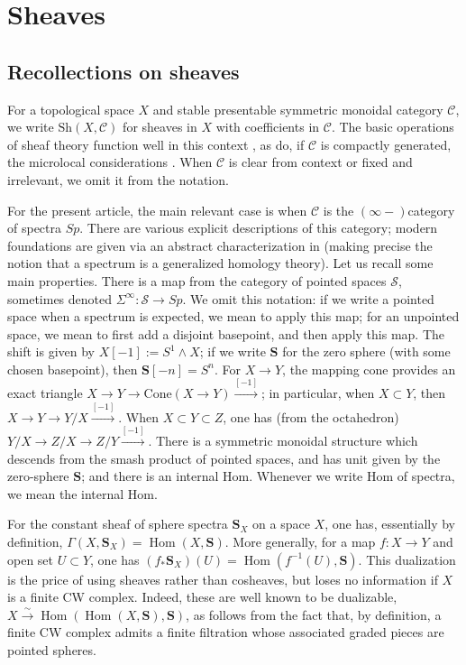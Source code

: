 \documentclass[12pt,a4paper]{article}
\numberwithin{equation}{section}
\theoremstyle{definition}
\theoremstyle{remark}
\newcommand{\Sh}{\mathrm{Sh}}
\renewcommand{\S}{\mathbf{S}}
\DeclareMathOperator{\Hom}{Hom}
\begin{document}
\section{Sheaves}\label{sec:Sh}
\subsection{Recollections on sheaves}
For a topological space $X$ and stable presentable symmetric monoidal category $\mathcal{C}$, we write $\Sh(X, \mathcal{C})$ for sheaves in $X$ with coefficients in $\mathcal{C}$.
The basic operations of sheaf theory function well in this context \cite{Volpe}, as do, if $\mathcal{C}$ is compactly generated, the microlocal considerations \cite{Robalo-Schapira}.   When $\mathcal{C}$ is clear from context or fixed and irrelevant, we omit it from the notation.

For the present article, the main relevant case is when $\mathcal{C}$ is the $(\infty-)$category of spectra $Sp$.  There are various explicit descriptions of this category; modern foundations are given via an abstract characterization in \cite[Chap. 1]{Lurie-HA} (making precise the notion that a spectrum is a generalized homology theory).  Let us recall some main properties.  There is a map from the category of pointed spaces $\mathcal{S}$, sometimes denoted $\Sigma^\infty: \mathcal{S} \to Sp$.  We omit this notation: if we write a pointed space when a spectrum is expected, we mean to apply this map; for an unpointed space, we mean to first add a disjoint basepoint, and then apply this map.  The shift is given by $X[-1] := S^1 \wedge X$; if we write $\S$ for the zero sphere (with some chosen basepoint), then $\S[-n] = S^n$.
For $X \to Y$, the mapping cone provides an exact triangle $X \to Y \to \mathrm{Cone}(X \to Y) \xrightarrow{[-1]}$; in particular, when $X \subset Y$, then $X \to Y \to Y/X \xrightarrow{[-1]}$.  When $X \subset Y \subset Z$, one has (from the octahedron) $Y/X \to Z/X \to Z/Y \xrightarrow{[-1]}$.
There is a symmetric monoidal structure which descends from the smash product of pointed spaces, and has unit given by the zero-sphere $\S$; and there is an internal Hom.  Whenever we write Hom of spectra, we mean the internal Hom.

For the constant sheaf of sphere spectra $\S_X$ on a space $X$, one has, essentially by definition, $\Gamma(X, \S_X) = \Hom(X, \S)$.  More generally, for a map $f: X \to Y$ and open set $U \subset Y$,
one has
$(f_* \S_X)(U) = \Hom(f^{-1}(U), \S)$.
This dualization is the price of using sheaves rather than cosheaves, but loses no information if $X$ is a finite CW complex.  Indeed, these are well known to be dualizable,
$X \xrightarrow{\sim} \Hom(\Hom(X, \S), \S)$, as follows from the fact that, by definition, a finite CW complex admits a finite filtration whose associated graded pieces are pointed spheres.
\end{document}

